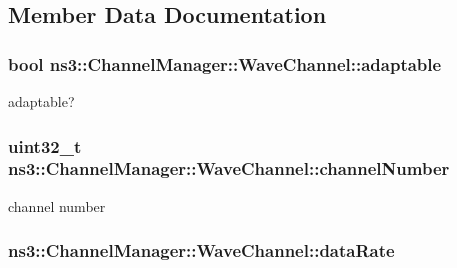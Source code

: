 \subsection{Member Data Documentation}
\subsubsection[{\texorpdfstring{adaptable}{adaptable}}]{\setlength{\rightskip}{0pt plus 5cm}bool ns3\+::\+Channel\+Manager\+::\+Wave\+Channel\+::adaptable}\hypertarget{structns3_1_1ChannelManager_1_1WaveChannel_ae1903f2249f14c22639043ce06956623}{}\label{structns3_1_1ChannelManager_1_1WaveChannel_ae1903f2249f14c22639043ce06956623}


adaptable? 

\subsubsection[{\texorpdfstring{channel\+Number}{channelNumber}}]{\setlength{\rightskip}{0pt plus 5cm}uint32\+\_\+t ns3\+::\+Channel\+Manager\+::\+Wave\+Channel\+::channel\+Number}\hypertarget{structns3_1_1ChannelManager_1_1WaveChannel_a78854f9258142c492ac15f842f74fa73}{}\label{structns3_1_1ChannelManager_1_1WaveChannel_a78854f9258142c492ac15f842f74fa73}


channel number 

\subsubsection[{\texorpdfstring{data\+Rate}{dataRate}}]{ ns3\+::\+Channel\+Manager\+::\+Wave\+Channel\+::data\+Rate}\hypertarget{structns3_1_1ChannelManager_1_1WaveChannel_a7738dfbc7f86553e8609d49230a43ec5}{}\label{structns3_1_1ChannelManager_1_1WaveChannel_a7738dfbc7f86553e8609d49230a43ec5}


